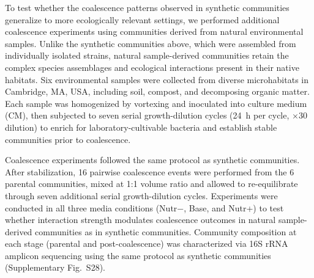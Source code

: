 To test whether the coalescence patterns observed in synthetic communities generalize to more ecologically relevant settings, we performed additional coalescence experiments using communities derived from natural environmental samples. Unlike the synthetic communities above, which were assembled from individually isolated strains, natural sample-derived communities retain the complex species assemblages and ecological interactions present in their native habitats. Six environmental samples were collected from diverse microhabitats in Cambridge, MA, USA, including soil, compost, and decomposing organic matter. Each sample was homogenized by vortexing and inoculated into culture medium (CM), then subjected to seven serial growth-dilution cycles (24~h per cycle, $\times$30 dilution) to enrich for laboratory-cultivable bacteria and establish stable communities prior to coalescence.

Coalescence experiments followed the same protocol as synthetic communities. After stabilization, 16 pairwise coalescence events were performed from the 6 parental communities, mixed at 1:1 volume ratio and allowed to re-equilibrate through seven additional serial growth-dilution cycles. Experiments were conducted in all three media conditions (Nutr$-$, Base, and Nutr+) to test whether interaction strength modulates coalescence outcomes in natural sample-derived communities as in synthetic communities. Community composition at each stage (parental and post-coalescence) was characterized via 16S rRNA amplicon sequencing using the same protocol as synthetic communities (Supplementary Fig.~S28).
